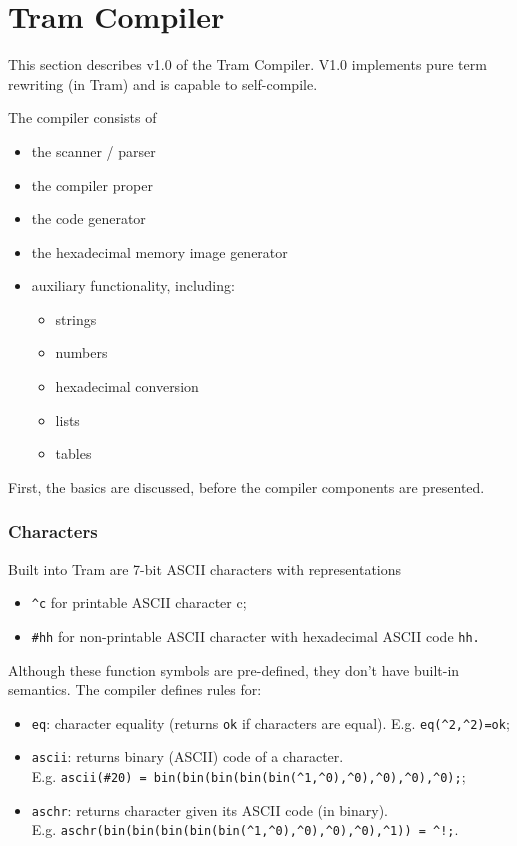 \documentclass[11pt,twoside]{memoir}
\def\T{\texttt}
\begin{document}
\chapter{Tram Compiler}
This section describes v1.0 of the Tram Compiler. V1.0 implements pure term rewriting (in Tram) and is capable to self-compile.

The compiler consists of

\begin{itemize}
	\item the scanner / parser
	\item the compiler proper
	\item the code generator
	\item the hexadecimal memory image generator
	\item auxiliary functionality, including:
	\begin{itemize}
		\item strings
		\item numbers
		\item hexadecimal conversion
		\item lists
		\item tables
	\end{itemize}
\end{itemize}

First, the basics are discussed, before the compiler components are presented. 

\subsection{Characters}
Built into Tram are 7-bit ASCII characters with representations

\begin{itemize}
	\item \T{\^{}c} for printable ASCII character c;
	\item \T{\#hh} for non-printable ASCII character with hexadecimal ASCII code \T{hh.}
\end{itemize}

Although these function symbols are pre-defined, they don't have built-in semantics. The compiler defines rules for:

\begin{itemize}
	\item \T{eq}: character equality (returns \T{ok} if characters are equal). E.g. \T{eq(\^{}2,\^{}2)=ok};
	\item \T{ascii}: returns binary (ASCII) code of a character. \\
	E.g. \T{ascii(\#20) = bin(bin(bin(bin(bin(\^{}1,\^{}0),\^{}0),\^{}0),\^{}0),\^{}0);};
	\item \T{aschr}: returns character given its ASCII code (in binary).\\
	E.g. \T{aschr(bin(bin(bin(bin(bin(\^{}1,\^{}0),\^{}0),\^{}0),\^{}0),\^{}1)) = \^{}!;}.
\end{itemize}
\end{document}
